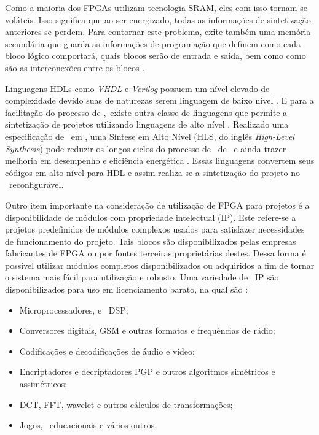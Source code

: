         Como a maioria dos FPGAs utilizam tecnologia SRAM, eles com isso tornam-se voláteis.
        Isso significa que ao ser energizado, todas as informações de sintetização anteriores se perdem.
        Para contornar este problema, exite também uma memória secundária que guarda as informações de programação que definem como cada bloco lógico comportará, quais blocos serão de entrada e saída, bem como como são as interconexões entre os blocos \cite{tocci2003sistemas}.
                
        Linguagens HDLs como \textit{VHDL} e \textit{Verilog} possuem um nível elevado de complexidade devido suas de naturezas serem linguagem de baixo nível \citep{Choi2016}.
        E para a facilitação do processo de \design,\ existe outra classe de linguagens que permite a sintetização de projetos utilizando linguagens de alto nível \citep{Sass2010}.
        Realizado uma especificação de \design\ em \software, uma Síntese em Alto Nível (HLS, do inglês \textit{High-Level Synthesis}) pode reduzir os longos ciclos do processo de \design\ de \hardware\ e ainda trazer melhoria em desempenho e eficiência energética \citep{Choi2016}.
        Essas linguagens convertem seus códigos em alto nível para HDL e assim realiza-se a sintetização do projeto no \hardware\ reconfigurável.
        
        
        Outro item importante na consideração de utilização de FPGA para projetos é a disponibilidade de módulos com propriedade intelectual (IP).
        Este refere-se a projetos predefinidos de módulos complexos usados para satisfazer necessidades de funcionamento do projeto.
        Tais blocos são disponibilizados pelas empresas fabricantes de FPGA ou por fontes terceiras proprietárias destes.
        Dessa forma é possível utilizar módulos completos disponibilizados ou adquiridos a fim de tornar o sistema mais fácil para utilização e robusto.
        Uma variedade de \cores\ IP são disponibilizados para uso em licenciamento barato, na qual são \citep{coffman1999real}:
        \begin{itemize}
            \item Microprocessadores, e \cores\ DSP;
            \item Conversores digitais, GSM e outras formatos e frequências de rádio;
            \item Codificações e decodificações de áudio e vídeo;
            \item Encriptadores e decriptadores PGP e outros algoritmos simétricos e assimétricos;\
            \item DCT, FFT, wavelet e outros cálculos de transformações;
            \item Jogos, \cores\ educacionais e vários outros.
        \end{itemize}
        
